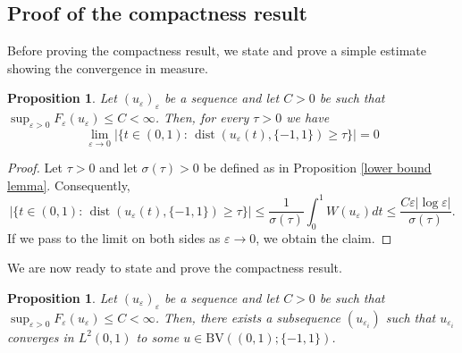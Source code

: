 \documentclass[12pt]{article}
\newtheorem{proposition}[definition]{Proposition}
\newcommand{\BV}{\mathrm{BV}}
\numberwithin{equation}{section}
\begin{document}
\subsection{Proof of the compactness result}
Before proving the compactness result, we state and prove a simple estimate showing the convergence in measure.


\begin{proposition}\label{convergence in measure}
   Let $(u_{\varepsilon})_{\varepsilon}$ be a sequence and let $C>0$ be such that $\sup_{\varepsilon>0}F_{\varepsilon}(u_{\varepsilon})\le C<\infty$. Then, for every $\tau>0$ we have
\[
\lim_{\varepsilon\to0}|\{t\in(0,1):\,\operatorname{dist}(u_{\varepsilon}(t),\{-1,1\})\ge\tau\}|=0
\]
\end{proposition}

\begin{proof}
Let $\tau>0$ and let $\sigma(\tau)>0$ be defined as in Proposition 
\ref{lower bound lemma}.
Consequently,
\[
|\{t\in(0,1):\,\operatorname{dist}(u_{\varepsilon}(t),\{-1,1\})\ge\tau\}|\le\frac{1}{\sigma(\tau)}\int_{0}^{1}W(u_{\varepsilon})dt\le\frac{C\varepsilon|\log{\varepsilon}|}{\sigma(\tau)}.
\]
If we pass to the limit on both sides as $\varepsilon\to0$, we obtain the claim.
\end{proof}
We are now ready to state and prove the compactness result.


\begin{proposition}\label{compactness}
Let $(u_{\varepsilon})_{\varepsilon}$ be a sequence and let $C>0$ be such that $\sup_{\varepsilon>0}F_{\varepsilon}(u_{\varepsilon})\le C<\infty$. Then, there exists a subsequence $(u_{\varepsilon_{i}})$ such that $u_{\varepsilon_{i}}$ converges in $L^{2}(0,1)$ to some $u\in\BV((0,1);\{-1,1\})$.
\end{proposition}
\end{document}
